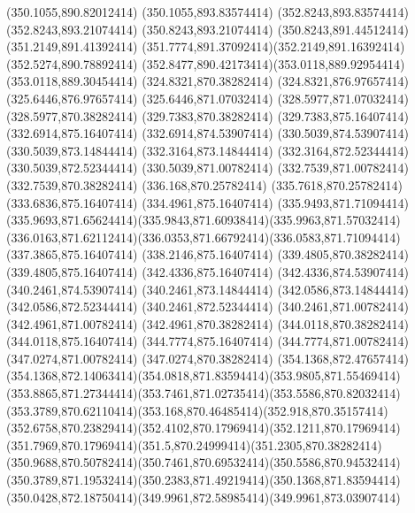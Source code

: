 {{	\lineto(350.1055,890.82012414)
	\lineto(350.1055,893.83574414)
	\lineto(352.8243,893.83574414)
	\lineto(352.8243,893.21074414)
	\lineto(350.8243,893.21074414)
	\lineto(350.8243,891.44512414)
	\lineto(351.2149,891.41392414)
	\curveto(351.7774,891.37092414)(352.2149,891.16392414)(352.5274,890.78892414)
	\curveto(352.8477,890.42173414)(353.0118,889.92954414)(353.0118,889.30454414)
	\closepath
	\moveto(324.8321,870.38282414)
	\lineto(324.8321,876.97657414)
	\lineto(325.6446,876.97657414)
	\lineto(325.6446,871.07032414)
	\lineto(328.5977,871.07032414)
	\lineto(328.5977,870.38282414)
	\closepath
	\moveto(329.7383,870.38282414)
	\lineto(329.7383,875.16407414)
	\lineto(332.6914,875.16407414)
	\lineto(332.6914,874.53907414)
	\lineto(330.5039,874.53907414)
	\lineto(330.5039,873.14844414)
	\lineto(332.3164,873.14844414)
	\lineto(332.3164,872.52344414)
	\lineto(330.5039,872.52344414)
	\lineto(330.5039,871.00782414)
	\lineto(332.7539,871.00782414)
	\lineto(332.7539,870.38282414)
	\closepath
	\moveto(336.168,870.25782414)
	\lineto(335.7618,870.25782414)
	\lineto(333.6836,875.16407414)
	\lineto(334.4961,875.16407414)
	\lineto(335.9493,871.71094414)
	\curveto(335.9693,871.65624414)(335.9843,871.60938414)(335.9963,871.57032414)
	\curveto(336.0163,871.62112414)(336.0353,871.66792414)(336.0583,871.71094414)
	\lineto(337.3865,875.16407414)
	\lineto(338.2146,875.16407414)
	\closepath
	\moveto(339.4805,870.38282414)
	\lineto(339.4805,875.16407414)
	\lineto(342.4336,875.16407414)
	\lineto(342.4336,874.53907414)
	\lineto(340.2461,874.53907414)
	\lineto(340.2461,873.14844414)
	\lineto(342.0586,873.14844414)
	\lineto(342.0586,872.52344414)
	\lineto(340.2461,872.52344414)
	\lineto(340.2461,871.00782414)
	\lineto(342.4961,871.00782414)
	\lineto(342.4961,870.38282414)
	\closepath
	\moveto(344.0118,870.38282414)
	\lineto(344.0118,875.16407414)
	\lineto(344.7774,875.16407414)
	\lineto(344.7774,871.00782414)
	\lineto(347.0274,871.00782414)
	\lineto(347.0274,870.38282414)
	\closepath
	\moveto(354.1368,872.47657414)
	\curveto(354.1368,872.14063414)(354.0818,871.83594414)(353.9805,871.55469414)
	\curveto(353.8865,871.27344414)(353.7461,871.02735414)(353.5586,870.82032414)
	\curveto(353.3789,870.62110414)(353.168,870.46485414)(352.918,870.35157414)
	\curveto(352.6758,870.23829414)(352.4102,870.17969414)(352.1211,870.17969414)
	\curveto(351.7969,870.17969414)(351.5,870.24999414)(351.2305,870.38282414)
	\curveto(350.9688,870.50782414)(350.7461,870.69532414)(350.5586,870.94532414)
	\curveto(350.3789,871.19532414)(350.2383,871.49219414)(350.1368,871.83594414)
	\curveto(350.0428,872.18750414)(349.9961,872.58985414)(349.9961,873.03907414)
}}
